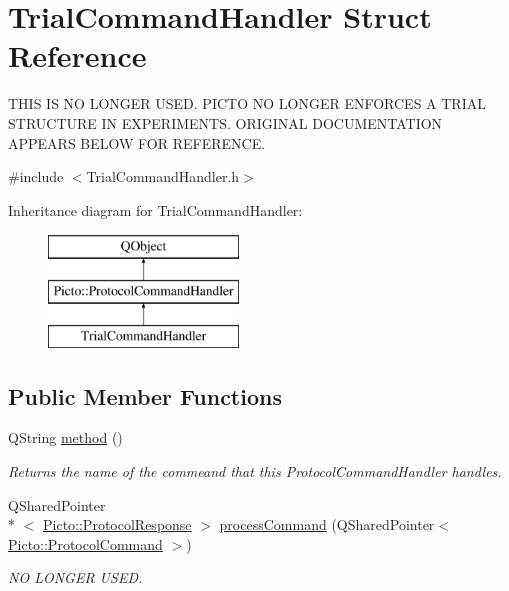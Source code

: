 \hypertarget{struct_trial_command_handler}{\section{Trial\-Command\-Handler Struct Reference}
\label{struct_trial_command_handler}
}


T\-H\-I\-S I\-S N\-O L\-O\-N\-G\-E\-R U\-S\-E\-D. P\-I\-C\-T\-O N\-O L\-O\-N\-G\-E\-R E\-N\-F\-O\-R\-C\-E\-S A T\-R\-I\-A\-L S\-T\-R\-U\-C\-T\-U\-R\-E I\-N E\-X\-P\-E\-R\-I\-M\-E\-N\-T\-S. O\-R\-I\-G\-I\-N\-A\-L D\-O\-C\-U\-M\-E\-N\-T\-A\-T\-I\-O\-N A\-P\-P\-E\-A\-R\-S B\-E\-L\-O\-W F\-O\-R R\-E\-F\-E\-R\-E\-N\-C\-E.  




{\ttfamily \#include $<$Trial\-Command\-Handler.\-h$>$}

Inheritance diagram for Trial\-Command\-Handler\-:\begin{figure}[H]
\begin{center}
\leavevmode
\includegraphics[height=3.000000cm]{struct_trial_command_handler}
\end{center}
\end{figure}
\subsection*{Public Member Functions}
\begin{DoxyCompactItemize}
\item 
\hypertarget{struct_trial_command_handler_aa8ef9ee3696c17e91caedbe329689414}{Q\-String \hyperlink{struct_trial_command_handler_aa8ef9ee3696c17e91caedbe329689414}{method} ()}\label{struct_trial_command_handler_aa8ef9ee3696c17e91caedbe329689414}

\begin{DoxyCompactList}\small\item\em Returns the name of the commeand that this Protocol\-Command\-Handler handles. \end{DoxyCompactList}\item 
\hypertarget{struct_trial_command_handler_a62bfdc507d55db394295be7197e2ff61}{Q\-Shared\-Pointer\\*
$<$ \hyperlink{struct_picto_1_1_protocol_response}{Picto\-::\-Protocol\-Response} $>$ \hyperlink{struct_trial_command_handler_a62bfdc507d55db394295be7197e2ff61}{process\-Command} (Q\-Shared\-Pointer$<$ \hyperlink{struct_picto_1_1_protocol_command}{Picto\-::\-Protocol\-Command} $>$)}\label{struct_trial_command_handler_a62bfdc507d55db394295be7197e2ff61}

\begin{DoxyCompactList}\small\item\em N\-O L\-O\-N\-G\-E\-R U\-S\-E\-D. \end{DoxyCompactList}\end{DoxyCompactItemize}


